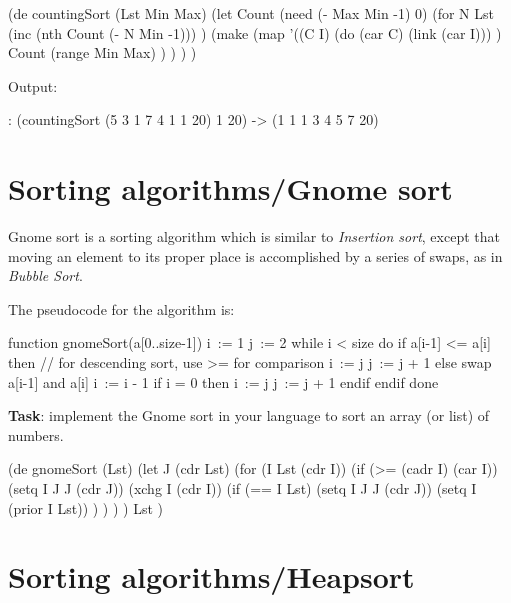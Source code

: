 \begin{itemize}
\begin{wideverbatim}

(de countingSort (Lst Min Max)
   (let Count (need (- Max Min -1) 0)
      (for N Lst
         (inc (nth Count (- N Min -1))) )
      (make
         (map
            '((C I)
               (do (car C) (link (car I))) )
            Count
            (range Min Max) ) ) ) )

Output:

: (countingSort (5 3 1 7 4 1 1 20) 1 20)
-> (1 1 1 3 4 5 7 20)

\end{wideverbatim}

\pagebreak{}
\section*{Sorting algorithms/Gnome sort}

Gnome sort is a sorting algorithm which is similar to \emph{Insertion
  sort}, except that moving an element to its proper place is
accomplished by a series of swaps, as in \emph{Bubble Sort}.

The pseudocode for the algorithm is:

\begin{wideverbatim}
function gnomeSort(a[0..size-1])
    i := 1
    j := 2
    while i < size do
        if a[i-1] <= a[i] then
            // for descending sort, use >= for comparison
            i := j
            j := j + 1 
        else
            swap a[i-1] and a[i]
            i := i - 1
            if i = 0 then
                i := j
                j := j + 1
            endif
        endif
    done
\end{wideverbatim}

\textbf{Task}: implement the Gnome sort in your language to sort an
array (or list) of numbers.

\begin{wideverbatim}
(de gnomeSort (Lst)
   (let J (cdr Lst)
      (for (I Lst (cdr I))
         (if (>= (cadr I) (car I))
            (setq I J  J (cdr J))
            (xchg I (cdr I))
            (if (== I Lst)
               (setq I J  J (cdr J))
               (setq I (prior I Lst)) ) ) ) )
   Lst )

\end{wideverbatim}

\pagebreak{}
\section*{Sorting algorithms/Heapsort}


\end{itemize}
